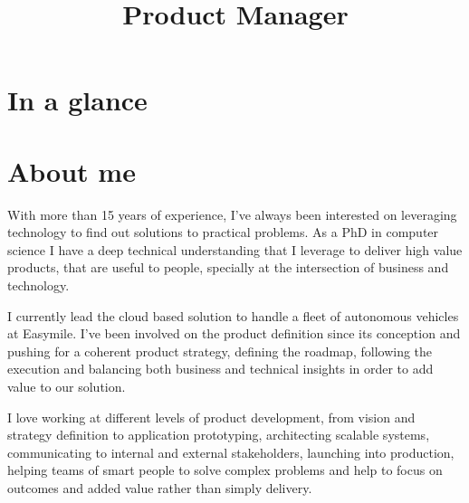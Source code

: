 \documentclass[10pt,a4paper,sans]{moderncv}
\title{Product Manager}
\begin{document}
\makecvtitle



\section{In a glance}



\section{About me}
With more than 15 years of experience, I've always been interested on leveraging technology to find out solutions to practical problems. As a PhD in computer science I have a deep technical understanding that I leverage to deliver high value products, that are useful to people, specially at the intersection of business and technology.

I currently lead the cloud based solution to handle a fleet of autonomous vehicles at Easymile. I’ve been involved on the product definition since its conception and pushing for a coherent product strategy, defining the roadmap, following the execution and balancing both business and technical insights in order to add value to our solution.

I love working at different levels of product development, from vision and strategy definition to application prototyping, architecting scalable systems, communicating to internal and external stakeholders, launching into production, helping teams of smart people to solve complex problems and help to focus on outcomes and added value rather than simply delivery.

\end{document}
